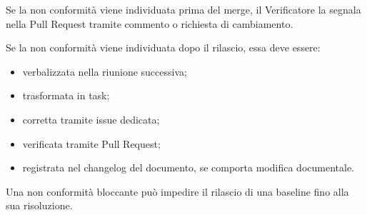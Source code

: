 Se la non conformità viene individuata prima del merge, il Verificatore la segnala
nella Pull Request tramite commento o richiesta di cambiamento.

Se la non conformità viene individuata dopo il rilascio, essa deve essere:

\begin{itemize}
    \item verbalizzata nella riunione successiva;
    \item trasformata in task;
    \item corretta tramite issue dedicata;
    \item verificata tramite Pull Request;
    \item registrata nel changelog del documento, se comporta modifica documentale.
\end{itemize}

Una non conformità bloccante può impedire il rilascio di una baseline fino alla
sua risoluzione.
